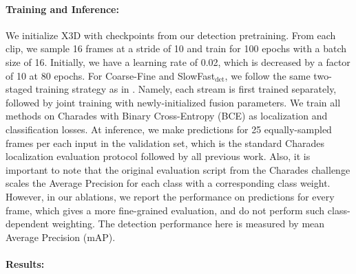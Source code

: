 \documentclass[10pt,twocolumn,letterpaper]{article}
\begin{document}
\vspace{-1mm}
\paragraph{Training and Inference:} We initialize X3D \cite{feichtenhofer2020x3d} with checkpoints from our detection pretraining. From each clip, we sample 16 frames at a stride of 10 and train for 100 epochs with a batch size of 16. Initially, we have a learning rate of 0.02, which is decreased by a factor of 10 at 80 epochs. For Coarse-Fine and SlowFast$_\text{det}$, we follow the same two-staged training strategy as in \cite{kahatapitiya2021coarse}. Namely, each stream is first trained separately, followed by joint training with newly-initialized fusion parameters. We train all methods on Charades with Binary Cross-Entropy (BCE) as localization and classification losses. At inference, we make predictions for 25 equally-sampled frames per each input in the validation set, which is the standard Charades localization evaluation protocol \cite{sigurdsson2016hollywood} followed by all previous work. Also, it is important to note that the original evaluation script from the Charades challenge scales the Average Precision for each class with a corresponding class weight. However, in our ablations, we report the performance on predictions for every frame, which gives a more fine-grained evaluation, and do not perform such class-dependent weighting. The detection performance here is measured by mean Average Precision (mAP).

\vspace{-1mm}
\paragraph{Results:}
\label{subsubsec:main_results}
\end{document}
